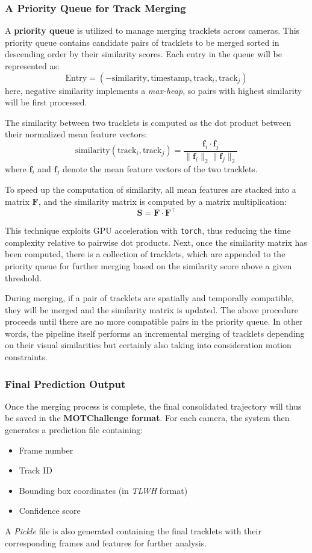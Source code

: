 \subsubsection{A Priority Queue for Track Merging}
A \textbf{priority queue} is utilized to manage merging tracklets across cameras. This priority queue contains candidate pairs of tracklets to be merged sorted in descending order by their similarity scores. Each entry in the queue will be represented as:
\[
    \text{Entry} = (-\text{similarity}, \text{timestamp}, \text{track}_i, \text{track}_j)
\]
here, negative similarity implements a \textit{max-heap}, so pairs with highest similarity will be first processed.

The similarity between two tracklets is computed as the dot product between their normalized mean feature vectors:
\[
    \text{similarity}(\text{track}_i, \text{track}_j) = \frac{\mathbf{f}_i \cdot \mathbf{f}_j}{\|\mathbf{f}_i\|_2 \|\mathbf{f}_j\|_2}
\]
where \(\mathbf{f}_i\) and \(\mathbf{f}_j\) denote the mean feature vectors of the two tracklets.

To speed up the computation of similarity, all mean features are stacked into a matrix \(\mathbf{F}\), and the similarity matrix is computed by a matrix multiplication:
\[
    \mathbf{S} = \mathbf{F} \cdot \mathbf{F}^\top
\]

This technique exploits GPU acceleration with \texttt{torch}, thus reducing the time complexity relative to pairwise dot products. Next, once the similarity matrix has been computed, there is a collection of tracklets, which are appended to the priority queue for further merging based on the similarity score above a given threshold.

During merging, if a pair of tracklets are spatially and temporally compatible, they will be merged and the similarity matrix is updated. The above procedure proceeds until there are no more compatible pairs in the priority queue. In other words, the pipeline itself performs an incremental merging of tracklets depending on their visual similarities but certainly also taking into consideration motion constraints.

\subsubsection{Final Prediction Output}
Once the merging process is complete, the final consolidated trajectory will thus be saved in the \textbf{MOTChallenge format}. For each camera, the system then generates a prediction file containing:
\begin{itemize}
    \item Frame number
    \item Track ID
    \item Bounding box coordinates (in \textit{TLWH} format)
    \item Confidence score
\end{itemize}
A \textit{Pickle} file is also generated containing the final tracklets with their corresponding frames and features for further analysis.

